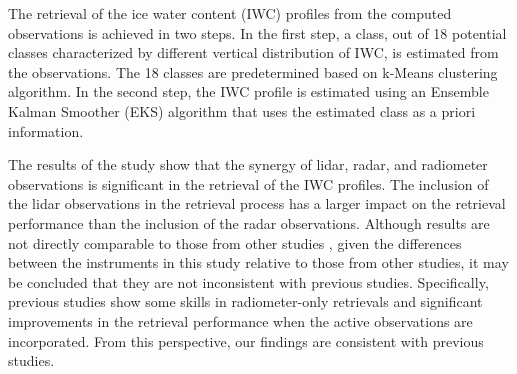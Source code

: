 \documentclass{ametsocV6.1}
\begin{document}
The retrieval of the ice water content (IWC) profiles from the computed observations is achieved in two
steps.  In the first step, a class, out of 18 potential classes characterized by different 
vertical distribution of IWC, is estimated from the observations. The 18 classes are predetermined based on
k-Means clustering algorithm.  In the second step, the IWC profile is estimated using an Ensemble Kalman
Smoother (EKS) algorithm that uses the estimated class as a priori information.

The results of the study show that the synergy of lidar, radar, and radiometer observations is significant
in the retrieval of the IWC profiles.  The inclusion of the lidar observations in the retrieval process has a
larger impact on the retrieval performance than the inclusion of the radar observations.  Although results are
not directly comparable to those from other studies \citep{pfreundschuh2020synergistic,liu2022assessing}, given the differences
between the instruments in this study relative to those from other studies, it may be concluded that they
are not inconsistent with previous studies. Specifically, previous studies show some skills in radiometer-only
retrievals and significant improvements in the retrieval performance when the active observations are incorporated.
From this perspective, our findings are consistent with previous studies.
\end{document}
